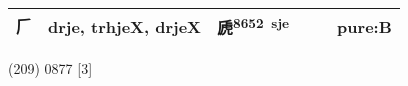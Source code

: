 \documentclass[14pt,a4paper]{scrartcl}
\begin{document}
\begin{longtable}[c]{@{}llllll@{}}
\begin{minipage}[t]{0.14\columnwidth}
𠂆
\strut\end{minipage} &
\begin{minipage}[t]{0.14\columnwidth}\raggedright\strut
drje, trhjeX, drjeX
\strut\end{minipage} &
\begin{minipage}[t]{0.14\columnwidth}\raggedright\strut
虒\textsuperscript{8652~sje}
\strut\end{minipage} &
\begin{minipage}[t]{0.14\columnwidth}\raggedright\strut
\strut\end{minipage} &
\begin{minipage}[t]{0.14\columnwidth}\raggedright\strut
\strut\end{minipage} &
\begin{minipage}[t]{0.14\columnwidth}\raggedright\strut
pure:B
\strut\end{minipage}\tabularnewline
\bottomrule
\end{longtable}

(209) 0877 {[}3{]}
\end{document}
